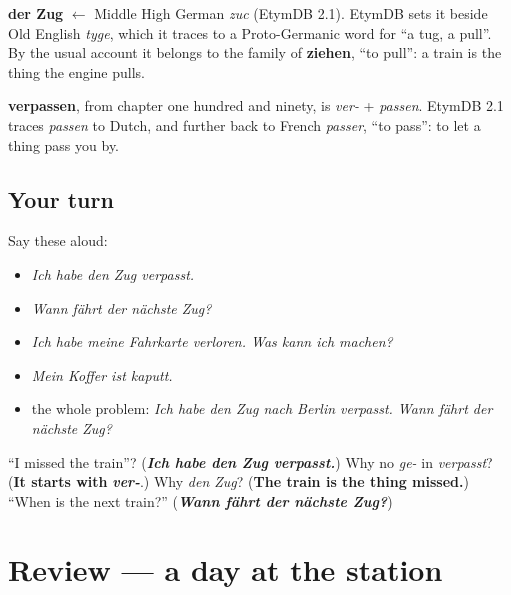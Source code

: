 \begin{cousinweb}
\textbf{der Zug} $\leftarrow$ Middle High German \emph{zuc} (EtymDB 2.1). EtymDB sets it beside Old English \emph{tyge}, which it traces to a Proto-Germanic word for \textquotedblleft{}a tug, a pull\textquotedblright{}. By the usual account it belongs to the family of \textbf{ziehen}, \textquotedblleft{}to pull\textquotedblright{}: a train is the thing the engine pulls.

\textbf{verpassen}, from chapter one hundred and ninety, is \emph{ver-} + \emph{passen}. EtymDB 2.1 traces \emph{passen} to Dutch, and further back to French \emph{passer}, \textquotedblleft{}to pass\textquotedblright{}: to let a thing pass you by.
\end{cousinweb}

\subsection*{Your turn}
Say these aloud:

\begin{itemize}
\raggedright
  \item \emph{Ich habe den Zug verpasst.}
  \item \emph{Wann fährt der nächste Zug?}
  \item \emph{Ich habe meine Fahrkarte verloren. Was kann ich machen?}
  \item \emph{Mein Koffer ist kaputt.}
  \item the whole problem: \emph{Ich habe den Zug nach Berlin verpasst. Wann fährt der nächste Zug?}
\end{itemize}

\begin{tcolorbox}[breakable,colback=teal!4,colframe=teal!35!black,title={Before you move on}]
\textquotedblleft{}I missed the train\textquotedblright{}? (\emph{\textbf{Ich habe den Zug verpasst.}}) Why no \emph{ge-} in \emph{verpasst}? (\textbf{It starts with} \emph{\textbf{ver-}}.) Why \emph{den Zug}? (\textbf{The train is the thing missed.}) \textquotedblleft{}When is the next train?\textquotedblright{} (\emph{\textbf{Wann fährt der nächste Zug?}})
\end{tcolorbox}
\section[(review)]{Review — a day at the station}

\label{lesson:GE-C257-review}



